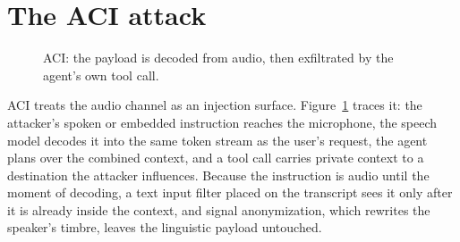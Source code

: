 \documentclass[a4paper]{article}
\newcommand{\aci}{\textsc{ACI}\xspace}
\begin{document}
\section{The ACI attack}
\label{sec:aci}
\begin{figure}[t]
\centering
{}
\caption{\aci: the payload is decoded from audio, then exfiltrated by the agent's own tool call.}
\label{fig:aci}
\end{figure}

\aci treats the audio channel as an injection surface. Figure~\ref{fig:aci} traces it: the attacker's spoken or embedded instruction reaches the microphone, the speech model decodes it into the same token stream as the user's request, the agent plans over the combined context, and a tool call carries private context to a destination the attacker influences. Because the instruction is audio until the moment of decoding, a text input filter placed on the transcript sees it only after it is already inside the context, and signal anonymization, which rewrites the speaker's timbre, leaves the linguistic payload untouched.
\end{document}

